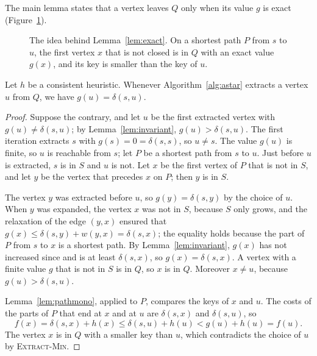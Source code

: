 The main lemma states that a vertex leaves $Q$ only when its value $g$ is exact
(Figure~\ref{fig:proof-idea}).

\begin{figure}[htbp]
  \centering
  
  \caption{The idea behind Lemma~\ref{lem:exact}. On a shortest path $P$ from
    $s$ to $u$, the first vertex $x$ that is not closed is in $Q$ with an exact
    value $g(x)$, and its key is smaller than the key of $u$.}\label{fig:proof-idea}
\end{figure}

\begin{lemma}\label{lem:exact}
Let $h$ be a consistent heuristic. Whenever Algorithm~\ref{alg:astar} extracts a
vertex $u$ from $Q$, we have $g(u) = \delta(s,u)$.
\end{lemma}

\begin{proof}
Suppose the contrary, and let $u$ be the first extracted vertex with
$g(u) \ne \delta(s,u)$; by Lemma~\ref{lem:invariant}, $g(u) > \delta(s,u)$. The
first iteration extracts $s$ with $g(s) = 0 = \delta(s,s)$, so $u \neq s$. The
value $g(u)$ is finite, so $u$ is reachable from $s$; let $P$ be a shortest path
from $s$ to $u$. Just before $u$ is extracted, $s$ is in $S$ and $u$ is not. Let
$x$ be the first vertex of $P$ that is not in $S$, and let $y$ be the vertex
that precedes $x$ on $P$; then $y$ is in $S$.

The vertex $y$ was extracted before $u$, so $g(y) = \delta(s,y)$ by the choice
of $u$. When $y$ was expanded, the vertex $x$ was not in $S$, because $S$ only
grows, and the relaxation of the edge $(y,x)$ ensured that
$g(x) \le \delta(s,y) + w(y,x) = \delta(s,x)$; the equality holds because the
part of $P$ from $s$ to $x$ is a shortest path. By Lemma~\ref{lem:invariant},
$g(x)$ has not increased since and is at least $\delta(s,x)$, so
$g(x) = \delta(s,x)$. A vertex with a finite value $g$ that is not in $S$ is in
$Q$, so $x$ is in $Q$. Moreover $x \neq u$, because $g(u) > \delta(s,u)$.

Lemma~\ref{lem:pathmono}, applied to $P$, compares the keys of $x$ and $u$. The
costs of the parts of $P$ that end at $x$ and at $u$ are $\delta(s,x)$ and
$\delta(s,u)$, so
\begin{equation}\label{eq:xbeforeu}
  f(x) = \delta(s,x) + h(x) \le \delta(s,u) + h(u) < g(u) + h(u) = f(u).
\end{equation}
The vertex $x$ is in $Q$ with a smaller key than $u$, which contradicts the
choice of $u$ by \textsc{Extract-Min}.
\end{proof}

